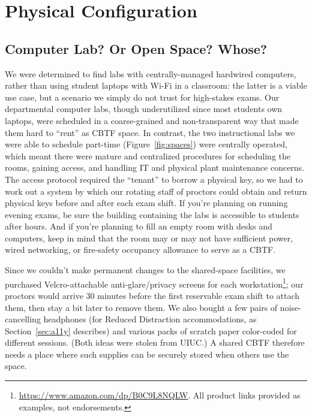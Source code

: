 \section{Physical Configuration}
\label{sec:physical}

\subsection{Computer Lab? Or Open Space? Whose?}

We were
determined to find labs with centrally-managed hardwired computers, rather than
using student laptops with Wi-Fi in a classroom: the latter is a viable use
case, but a scenario we simply do not trust for high-stakes exams.
Our departmental
computer labs, though underutilized since
most students own laptops, were scheduled in a 
coarse-grained and non-transparent way that made
them hard to ``rent'' as CBTF space.
In contrast, the two instructional labs we were able to schedule part-time
(Figure~\ref{fig:spaces}) were centrally operated, which 
meant there were mature and centralized
procedures for scheduling the rooms, gaining access, and handling IT
and  physical plant maintenance concerns.
The access protocol required the ``tenant''
to borrow a physical key, 
so we had to work out a system by which our rotating staff of proctors could obtain and return 
physical keys before and after each exam shift.
If you're planning on running evening exams, be sure the building
containing the labs is accessible to students after hours.
And if you're planning to fill an empty room with desks and computers,
keep in mind that the room may or may not have sufficient
power,
wired networking, or fire-safety occupancy allowance to serve as a CBTF.

Since we couldn't make permanent changes to the shared-space
facilities, we purchased Velcro-attachable anti-glare/privacy screens for
each
workstation\footnote{\url{https://www.amazon.com/dp/B0C9L8NQLW}. All product
links provided as examples, not endorsements.};
our proctors would  arrive 30 minutes before the
first reservable exam shift to attach them, then stay a bit later to
remove them.
We also bought a few pairs of
noise-cancelling headphones (for Reduced Distraction accommodations,
as Section~\ref{sec:a11y} describes) and various packs of scratch paper color-coded
for different sessions.
(Both ideas were stolen from UIUC.)
A shared CBTF therefore needs a place where such
supplies can be securely stored when others use the space.  

